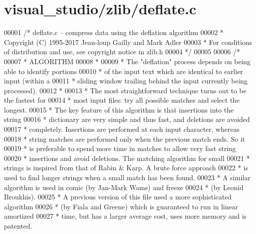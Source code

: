 \hypertarget{visual__studio_2zlib_2deflate_8c_source}{}\section{visual\+\_\+studio/zlib/deflate.c}
\label{visual__studio_2zlib_2deflate_8c_source}

\begin{DoxyCode}
00001 \textcolor{comment}{/* deflate.c -- compress data using the deflation algorithm}
00002 \textcolor{comment}{ * Copyright (C) 1995-2017 Jean-loup Gailly and Mark Adler}
00003 \textcolor{comment}{ * For conditions of distribution and use, see copyright notice in zlib.h}
00004 \textcolor{comment}{ */}
00005 
00006 \textcolor{comment}{/*}
00007 \textcolor{comment}{ *  ALGORITHM}
00008 \textcolor{comment}{ *}
00009 \textcolor{comment}{ *      The "deflation" process depends on being able to identify portions}
00010 \textcolor{comment}{ *      of the input text which are identical to earlier input (within a}
00011 \textcolor{comment}{ *      sliding window trailing behind the input currently being processed).}
00012 \textcolor{comment}{ *}
00013 \textcolor{comment}{ *      The most straightforward technique turns out to be the fastest for}
00014 \textcolor{comment}{ *      most input files: try all possible matches and select the longest.}
00015 \textcolor{comment}{ *      The key feature of this algorithm is that insertions into the string}
00016 \textcolor{comment}{ *      dictionary are very simple and thus fast, and deletions are avoided}
00017 \textcolor{comment}{ *      completely. Insertions are performed at each input character, whereas}
00018 \textcolor{comment}{ *      string matches are performed only when the previous match ends. So it}
00019 \textcolor{comment}{ *      is preferable to spend more time in matches to allow very fast string}
00020 \textcolor{comment}{ *      insertions and avoid deletions. The matching algorithm for small}
00021 \textcolor{comment}{ *      strings is inspired from that of Rabin & Karp. A brute force approach}
00022 \textcolor{comment}{ *      is used to find longer strings when a small match has been found.}
00023 \textcolor{comment}{ *      A similar algorithm is used in comic (by Jan-Mark Wams) and freeze}
00024 \textcolor{comment}{ *      (by Leonid Broukhis).}
00025 \textcolor{comment}{ *         A previous version of this file used a more sophisticated algorithm}
00026 \textcolor{comment}{ *      (by Fiala and Greene) which is guaranteed to run in linear amortized}
00027 \textcolor{comment}{ *      time, but has a larger average cost, uses more memory and is patented.}

\end{DoxyCode}
